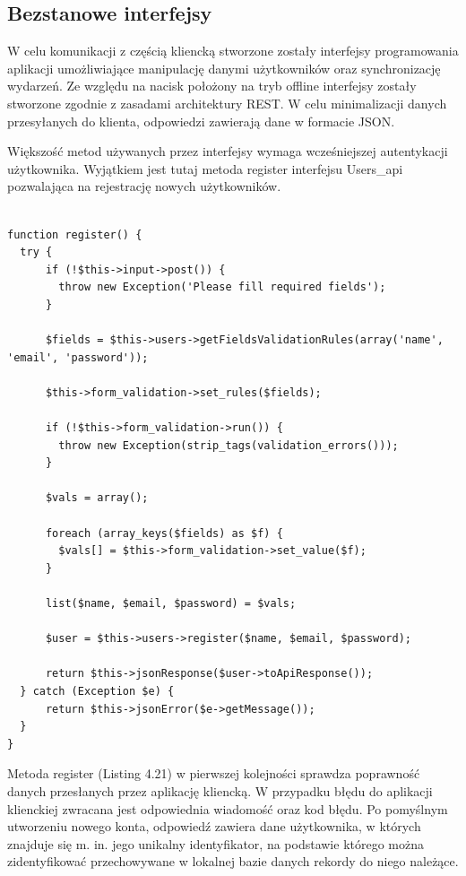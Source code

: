 \subsection{Bezstanowe interfejsy}
\label{bezstInter}

W celu komunikacji z częścią kliencką stworzone zostały interfejsy programowania aplikacji umożliwiające manipulację danymi użytkowników oraz synchronizację wydarzeń. Ze względu na nacisk położony na tryb offline interfejsy zostały stworzone zgodnie z zasadami architektury REST. W celu minimalizacji danych przesyłanych do klienta, odpowiedzi zawierają dane w formacie JSON.

Większość metod używanych przez interfejsy wymaga wcześniejszej autentykacji użytkownika. Wyjątkiem jest tutaj metoda register interfejsu Users\_api pozwalająca na rejestrację nowych użytkowników.

\begin{lstlisting}[caption=Rejestracja użytkowników przy użyciu metody register interfejsu Users\_api., label=amb, captionpos=b]

function register() {
  try {
      if (!$this->input->post()) {
      	throw new Exception('Please fill required fields');
      }

      $fields = $this->users->getFieldsValidationRules(array('name', 'email', 'password'));

      $this->form_validation->set_rules($fields);

      if (!$this->form_validation->run()) {
      	throw new Exception(strip_tags(validation_errors()));
      }

      $vals = array();

      foreach (array_keys($fields) as $f) {
      	$vals[] = $this->form_validation->set_value($f);
      }

      list($name, $email, $password) = $vals;

      $user = $this->users->register($name, $email, $password);

      return $this->jsonResponse($user->toApiResponse());
  } catch (Exception $e) {
      return $this->jsonError($e->getMessage());
  }
}

\end{lstlisting}

Metoda register (Listing 4.21) w pierwszej kolejności sprawdza poprawność danych przesłanych przez aplikację kliencką. W przypadku błędu do aplikacji klienckiej zwracana jest odpowiednia wiadomość oraz kod błędu. Po pomyślnym utworzeniu nowego konta, odpowiedź zawiera  dane użytkownika, w których znajduje się m. in. jego unikalny identyfikator, na podstawie którego można zidentyfikować przechowywane w lokalnej bazie danych rekordy do niego należące.

